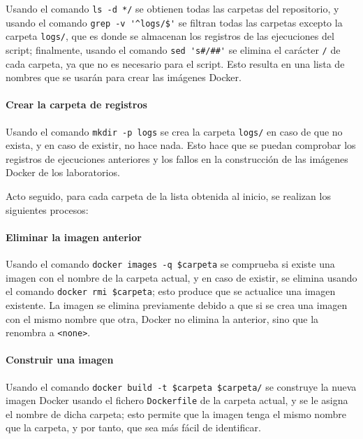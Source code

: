 \begin{appendices}
                Usando el comando \verb|ls -d */| se obtienen todas las carpetas del repositorio, y usando el comando \verb|grep -v '^logs/$'| se filtran todas las carpetas excepto la carpeta \texttt{logs/}, que es donde se almacenan los registros de las ejecuciones del script; finalmente, usando el comando \verb|sed 's#/##'| se elimina el carácter \texttt{/} de cada carpeta, ya que no es necesario para el script. Esto resulta en una lista de nombres que se usarán para crear las imágenes Docker.

            \paragraph{Crear la carpeta de registros}

                Usando el comando \texttt{mkdir -p logs} se crea la carpeta \texttt{logs/} en caso de que no exista, y en caso de existir, no hace nada. Esto hace que se puedan comprobar los registros de ejecuciones anteriores y los fallos en la construcción de las imágenes Docker de los laboratorios.

            Acto seguido, para cada carpeta de la lista obtenida al inicio, se realizan los siguientes procesos:

            \paragraph{Eliminar la imagen anterior}

                Usando el comando \verb|docker images -q $carpeta| se comprueba si existe una imagen con el nombre de la carpeta actual, y en caso de existir, se elimina usando el comando \verb|docker rmi $carpeta|; esto produce que se actualice una imagen existente. La imagen se elimina previamente debido a que si se crea una imagen con el mismo nombre que otra, Docker no elimina la anterior, sino que la renombra a \texttt{<none>}.

            \paragraph{Construir una imagen}

                Usando el comando \texttt{docker build -t \$carpeta \$carpeta/} se construye la nueva imagen Docker usando el fichero \texttt{Dockerfile} de la carpeta actual, y se le asigna el nombre de dicha carpeta; esto permite que la imagen tenga el mismo nombre que la carpeta, y por tanto, que sea más fácil de identificar.


\end{appendices}
